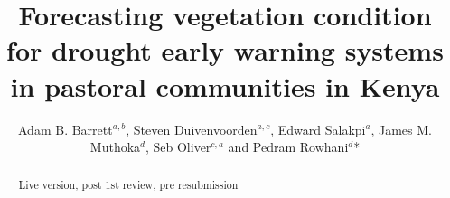 \documentclass[review]{elsarticle}
\begin{document}
\newcommand{\edit}[1]{\textcolor{blue}{#1}}

\begin{frontmatter}

\title{Forecasting vegetation condition for drought early warning systems in pastoral communities in Kenya}


\author{Adam B. Barrett$^{a,b}$, Steven Duivenvoorden$^{a,c}$, Edward Salakpi$^a$, James M. Muthoka$^{d}$, Seb Oliver$^{c,a}$ and Pedram Rowhani$^{d}$*}
\address{
	$^{a}$ \quad The Data Intensive Science Centre, Department of Physics and Astronomy, University of Sussex, Brighton BN1 9QH, UK\\
	$^{b}$ \quad Sackler Centre for Consciousness Science, Department of Informatics, University of Sussex, Brighton BN1 9QJ, UK \\
	$^{c}$ \quad Astronomy Centre, Department of Physics and Astronomy, University of Sussex, Brighton BN1 9QH, UK\\
	$^{d}$ \quad School of Global Studies, Department of Geography, University of Sussex, Brighton, BN1 9QJ, UK \\
	Corresponding author: P.Rowhani@sussex.ac.uk
	}








\begin{abstract}
{\color{red} Live version, post 1st review, pre resubmission}


\end{abstract}
\end{frontmatter}
\end{document}
